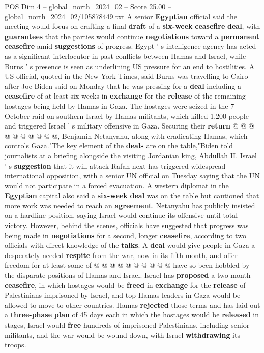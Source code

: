 \begin{textsample}{POS Dim 4 – global\_north\_2024\_02 – Score 25.00 – global\_north\_2024\_02/105878449.txt}
A senior \textbf{Egyptian} official said the meeting would focus on crafting a final \textbf{draft} of a \textbf{six-week} \textbf{ceasefire} \textbf{deal}, with \textbf{guarantees} that the parties would continue \textbf{negotiations} toward a \textbf{permanent} \textbf{ceasefire} amid \textbf{suggestions} of progress.
Egypt ' s intelligence agency has acted as a significant interlocutor in past conflicts between Hamas and Israel, while Burns ' s presence is seen as underlining US pressure for an end to hostilities.
A US official, quoted in the New York Times, said Burns was travelling to Cairo after Joe Biden said on Monday that he was pressing for a \textbf{deal} including a \textbf{ceasefire} of at least six weeks in \textbf{exchange} for the \textbf{release} of the remaining hostages being held by Hamas in Gaza.
The hostages were seized in the 7 October raid on southern Israel by Hamas militants, which killed 1,200 people and triggered Israel ' s military offensive in Gaza.
Securing their \textbf{return} @ @ @ @ @ @ @ @ @ @, Benjamin Netanyahu, along with eradicating Hamas, which controls Gaza."The key element of the \textbf{deals} are on the table,"Biden told journalists at a briefing alongside the visiting Jordanian king, Abdullah II.
Israel ' s \textbf{suggestion} that it will attack Rafah next has triggered widespread international opposition, with a senior UN official on Tuesday saying that the UN would not participate in a forced evacuation.
A western diplomat in the \textbf{Egyptian} capital also said a \textbf{six-week} \textbf{deal} was on the table but cautioned that more work was needed to reach an \textbf{agreement}.
Netanyahu has publicly insisted on a hardline position, saying Israel would continue its offensive until total victory.
However, behind the scenes, officials have suggested that progress was being made in \textbf{negotiations} for a second, longer \textbf{ceasefire}, according to two officials with direct knowledge of the \textbf{talks}.
A \textbf{deal} would give people in Gaza a desperately needed \textbf{respite} from the war, now in its fifth month, and offer freedom for at least some of @ @ @ @ @ @ @ @ @ @ have so been hobbled by the disparate positions of Hamas and Israel.
Israel has \textbf{proposed} a two-month \textbf{ceasefire}, in which hostages would be \textbf{freed} in \textbf{exchange} for the \textbf{release} of Palestinians imprisoned by Israel, and top Hamas leaders in Gaza would be allowed to move to other countries.
Hamas \textbf{rejected} those terms and has laid out a \textbf{three-phase} \textbf{plan} of 45 days each in which the hostages would be \textbf{released} in stages, Israel would \textbf{free} hundreds of imprisoned Palestinians, including senior militants, and the war would be wound down, with Israel \textbf{withdrawing} its troops.

\end{textsample}
